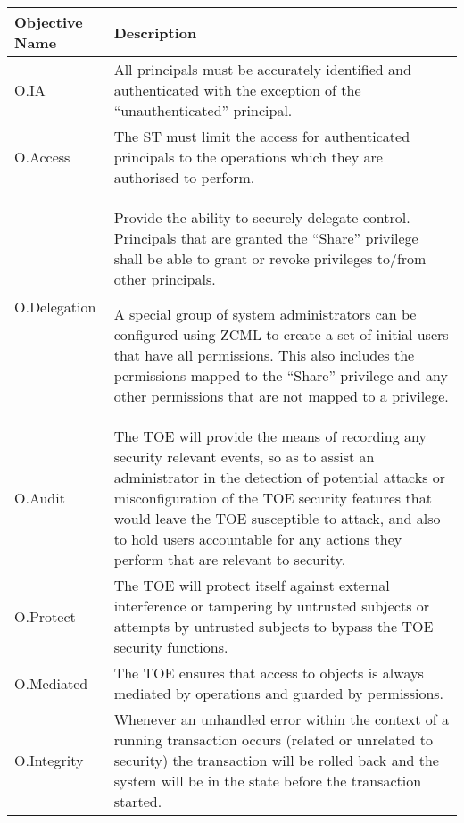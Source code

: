 \documentclass[12pt,english]{scrbook}
\begin{document}
\begin{longtable}[c]{lp{10cm}}
  \toprule
  Objective Name & Description \\
  \midrule\endhead
  
  O.IA
   & 
  All principals must be accurately identified and
  authenticated with the exception of the ``unauthenticated''
  principal.
   \\

  O.Access
   &

  The ST must limit the access for authenticated principals to the operations
  which they are authorised to perform.

  \\

  O.Delegation
   & 

  Provide the ability to securely delegate control. Principals that are granted
  the ``Share'' privilege shall be able to grant or revoke privileges to/from
  other principals.

  A special group of system administrators can be configured using ZCML to
  create a set of initial users that have all permissions. This also includes
  the permissions mapped to the ``Share'' privilege and any other permissions
  that are not mapped to a privilege.

  \\

  O.Audit
   & 
  The TOE will provide the means of recording any
  security relevant events, so as to assist an
  administrator in the detection of potential attacks
  or misconfiguration of the TOE security features
  that would leave the TOE susceptible to attack, and
  also to hold users accountable for any actions
  they perform that are relevant to security.
   \\

  O.Protect
   & 
  The TOE will protect itself against external
  interference or tampering by untrusted subjects or
  attempts by untrusted subjects to bypass the TOE
  security functions.
   \\

  O.Mediated
   & 
  The TOE ensures that access to objects is always
  mediated by operations and guarded by permissions.
   \\

  O.Integrity
   & 
  Whenever an unhandled error within the context of a
  running transaction occurs (related or unrelated
  to security) the transaction will be rolled back
  and the system will be in the state before the
  transaction started.
   \\


\end{longtable}
\end{document}
